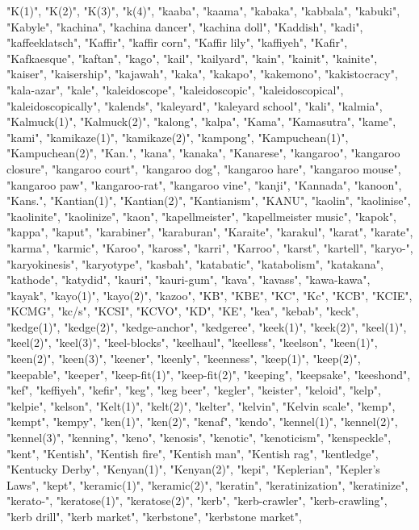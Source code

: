 "K(1)",
"K(2)",
"K(3)",
"k(4)",
"kaaba",
"kaama",
"kabaka",
"kabbala",
"kabuki",
"Kabyle",
"kachina",
"kachina dancer",
"kachina doll",
"Kaddish",
"kadi",
"kaffeeklatsch",
"Kaffir",
"kaffir corn",
"Kaffir lily",
"kaffiyeh",
"Kafir",
"Kafkaesque",
"kaftan",
"kago",
"kail",
"kailyard",
"kain",
"kainit",
"kainite",
"kaiser",
"kaisership",
"kajawah",
"kaka",
"kakapo",
"kakemono",
"kakistocracy",
"kala-azar",
"kale",
"kaleidoscope",
"kaleidoscopic",
"kaleidoscopical",
"kaleidoscopically",
"kalends",
"kaleyard",
"kaleyard school",
"kali",
"kalmia",
"Kalmuck(1)",
"Kalmuck(2)",
"kalong",
"kalpa",
"Kama",
"Kamasutra",
"kame",
"kami",
"kamikaze(1)",
"kamikaze(2)",
"kampong",
"Kampuchean(1)",
"Kampuchean(2)",
"Kan.",
"kana",
"kanaka",
"Kanarese",
"kangaroo",
"kangaroo closure",
"kangaroo court",
"kangaroo dog",
"kangaroo hare",
"kangaroo mouse",
"kangaroo paw",
"kangaroo-rat",
"kangaroo vine",
"kanji",
"Kannada",
"kanoon",
"Kans.",
"Kantian(1)",
"Kantian(2)",
"Kantianism",
"KANU",
"kaolin",
"kaolinise",
"kaolinite",
"kaolinize",
"kaon",
"kapellmeister",
"kapellmeister music",
"kapok",
"kappa",
"kaput",
"karabiner",
"karaburan",
"Karaite",
"karakul",
"karat",
"karate",
"karma",
"karmic",
"Karoo",
"kaross",
"karri",
"Karroo",
"karst",
"kartell",
"karyo-",
"karyokinesis",
"karyotype",
"kasbah",
"katabatic",
"katabolism",
"katakana",
"kathode",
"katydid",
"kauri",
"kauri-gum",
"kava",
"kavass",
"kawa-kawa",
"kayak",
"kayo(1)",
"kayo(2)",
"kazoo",
"KB",
"KBE",
"KC",
"Kc",
"KCB",
"KCIE",
"KCMG",
"kc/s",
"KCSI",
"KCVO",
"KD",
"KE",
"kea",
"kebab",
"keck",
"kedge(1)",
"kedge(2)",
"kedge-anchor",
"kedgeree",
"keek(1)",
"keek(2)",
"keel(1)",
"keel(2)",
"keel(3)",
"keel-blocks",
"keelhaul",
"keelless",
"keelson",
"keen(1)",
"keen(2)",
"keen(3)",
"keener",
"keenly",
"keenness",
"keep(1)",
"keep(2)",
"keepable",
"keeper",
"keep-fit(1)",
"keep-fit(2)",
"keeping",
"keepsake",
"keeshond",
"kef",
"keffiyeh",
"kefir",
"keg",
"keg beer",
"kegler",
"keister",
"keloid",
"kelp",
"kelpie",
"kelson",
"Kelt(1)",
"kelt(2)",
"kelter",
"kelvin",
"Kelvin scale",
"kemp",
"kempt",
"kempy",
"ken(1)",
"ken(2)",
"kenaf",
"kendo",
"kennel(1)",
"kennel(2)",
"kennel(3)",
"kenning",
"keno",
"kenosis",
"kenotic",
"kenoticism",
"kenspeckle",
"kent",
"Kentish",
"Kentish fire",
"Kentish man",
"Kentish rag",
"kentledge",
"Kentucky Derby",
"Kenyan(1)",
"Kenyan(2)",
"kepi",
"Keplerian",
"Kepler's Laws",
"kept",
"keramic(1)",
"keramic(2)",
"keratin",
"keratinization",
"keratinize",
"kerato-",
"keratose(1)",
"keratose(2)",
"kerb",
"kerb-crawler",
"kerb-crawling",
"kerb drill",
"kerb market",
"kerbstone",
"kerbstone market",
